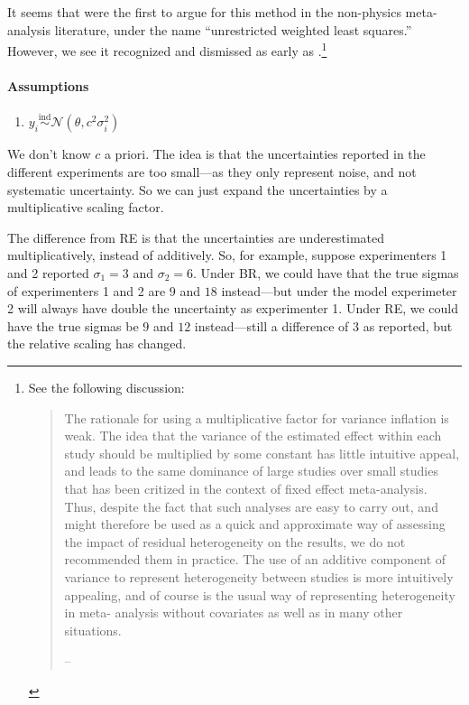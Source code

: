 \documentclass[letterpaper,12pt]{article}
\begin{document}
It seems that \citet{stanley2015neither} were the first to argue for this method in the non-physics meta-analysis literature, under the name ``unrestricted weighted least squares.'' However, we see it recognized and dismissed as early as \citet{thompson1999explaining}.\footnote{See the following discussion:
  \begin{quote}
The rationale for using a multiplicative factor for variance inflation is weak. The idea that the
variance of the estimated effect within each study should be multiplied by some constant has little
intuitive appeal, and leads to the same dominance of large studies over small studies that has
been critized in the context of fixed effect meta-analysis. Thus, despite the fact that such
analyses are easy to carry out, and might therefore be used as a quick and approximate way of
assessing the impact of residual heterogeneity on the results, we do not recommended them in
practice. The use of an additive component of variance to represent heterogeneity between studies
is more intuitively appealing, and of course is the usual way of representing heterogeneity in meta-
analysis without covariates as well as in many other situations.

\hfill{-- \citet[pg. 2705]{thompson1999explaining}}
  \end{quote}
}


\paragraph{Assumptions}\label{assumptions-2}

\begin{enumerate}
\item
  $y_i\overset{\mathrm{ind}}{\sim}\mathcal{N}(\theta,c^2\sigma_i^2)$
\end{enumerate}

We don't know $c$ a priori. The idea is that the uncertainties reported in the different experiments are too small---as they only represent noise, and not systematic uncertainty. So we can just expand the uncertainties by a multiplicative scaling factor.

The difference from RE is that the uncertainties are underestimated multiplicatively, instead of additively. So, for example, suppose experimenters 1 and 2 reported $\sigma_1=3$ and $\sigma_2=6$. Under BR, we could have that the true sigmas of experimenters 1 and 2 are $9$ and $18$ instead---but under the model experimeter 2 will always have double the uncertainty as experimenter 1. Under RE, we could have the true sigmas be $9$ and $12$ instead---still a difference of 3 as reported, but the relative scaling has changed.
\end{document}
